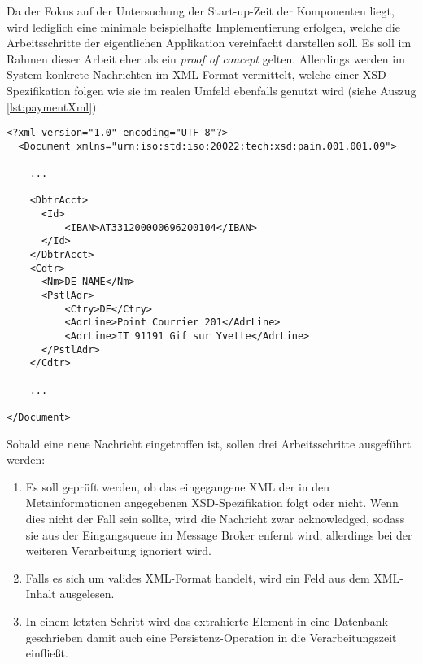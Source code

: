 Da der Fokus auf der Untersuchung der Start-up-Zeit der Komponenten liegt, wird lediglich eine minimale beispielhafte Implementierung erfolgen, welche die Arbeitsschritte der eigentlichen Applikation vereinfacht darstellen soll. Es soll im Rahmen dieser Arbeit eher als ein \emph{proof of concept} gelten. Allerdings werden im System konkrete Nachrichten im XML Format vermittelt, welche einer XSD-Spezifikation folgen wie sie im realen Umfeld ebenfalls genutzt wird (siehe Auszug \ref{lst:paymentXml}).

\begin{minipage}{\linewidth}
\begin{lstlisting}[style=xmlStyle,caption={Payment Format},label=lst:paymentXml]
  <?xml version="1.0" encoding="UTF-8"?>
  <Document xmlns="urn:iso:std:iso:20022:tech:xsd:pain.001.001.09">

    ...

    <DbtrAcct>
      <Id>
          <IBAN>AT331200000696200104</IBAN>
      </Id>
    </DbtrAcct>
    <Cdtr>
      <Nm>DE NAME</Nm>
      <PstlAdr>
          <Ctry>DE</Ctry>
          <AdrLine>Point Courrier 201</AdrLine>
          <AdrLine>IT 91191 Gif sur Yvette</AdrLine>
      </PstlAdr>
    </Cdtr>

    ... 

</Document>
\end{lstlisting}
\end{minipage}


Sobald eine neue Nachricht eingetroffen ist, sollen drei Arbeitsschritte ausgeführt werden:

\begin{enumerate}

  \item Es soll geprüft werden, ob das eingegangene XML der in den Metainformationen angegebenen XSD-Spezifikation folgt oder nicht. Wenn dies nicht der Fall sein sollte, wird die Nachricht zwar acknowledged, sodass sie aus der Eingangsqueue im Message Broker enfernt wird, allerdings bei der weiteren Verarbeitung ignoriert wird.

  \item Falls es sich um valides XML-Format handelt, wird ein Feld aus dem XML-Inhalt ausgelesen.

  \item In einem letzten Schritt wird das extrahierte Element in eine Datenbank geschrieben damit auch eine Persistenz-Operation in die Verarbeitungszeit einfließt.

\end{enumerate}

